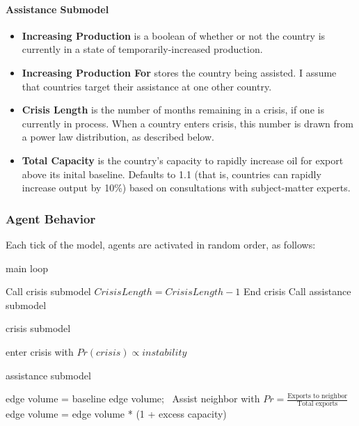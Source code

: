 \documentclass{article}
\begin{document}
\paragraph{Assistance Submodel}
\begin{itemize}
	\item \textbf{Increasing Production} is a boolean of whether or not the country is currently in a state of temporarily-increased production.
	\item \textbf{Increasing Production For} stores the country being assisted. I assume that countries target their assistance at one other country.
		\item \textbf{Crisis Length} is the number of months remaining in a crisis, if one is currently in process. When a country enters crisis, this number is drawn from a power law distribution, as described below.
			\item \textbf{Total Capacity} is the country's capacity to rapidly increase oil for export above its inital baseline. Defaults to 1.1 (that is, countries can rapidly increase output by 10\%) based on consultations with subject-matter experts. 
\end{itemize}

\subsubsection{Agent Behavior}

Each tick of the model, agents are activated in random order, as follows:

\begin{algorithm}[H]
	\caption{main loop}
	 {
			Call crisis submodel \;
		}{
			$Crisis Length = Crisis Length - 1$ \;
			 { End crisis \; }
		}
	 {
		Call assistance submodel \;
	}	
\end{algorithm}

\begin{algorithm}[H]
	\caption{crisis submodel}
		enter crisis with $Pr(crisis) \propto instability$ \;
\end{algorithm}


\begin{algorithm}[H]
	\caption{assistance submodel}
	 {
			 {
				 {
					edge volume = baseline edge volume;\
				}
			}
		} {
			 {
				 {
					Assist neighbor with $Pr = \frac{\text{Exports to neighbor}}{\text{Total exports}}$
				}
			}
			 {
				 {
					edge volume = edge volume * (1 + excess capacity)\;
				}
			}
		}

\end{algorithm}
\end{document}
